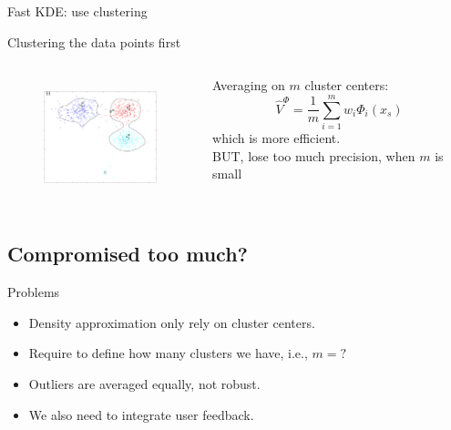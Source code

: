 \begin{frame}{Fast KDE: use clustering}
\begin{flushleft}
Clustering the data points first
\end{flushleft}
\begin{columns}
\hskip10pt
\begin{column}{.35\textwidth}
\begin{figure}
\includegraphics[width=3.5cm, height=3.5cm]{imgs/kclust}
\end{figure}
\end{column}
\begin{column}{.65\textwidth}
\small
\centering
Averaging on $m$ cluster centers:
\[
\hat{V}^\Phi=\frac{1}{m}\sum_{i=1}^m w_i\Phi_i(x_s)
\]
which is more efficient.\\ \vskip20pt \pause
\alert{BUT, lose too much precision, when $m$ is small}
\end{column}
\end{columns}
\end{frame}


\subsection{Compromised too much?}
\begin{frame}{Problems}
\begin{itemize}
\item Density approximation only rely on cluster centers.
\item Require to define how many clusters we have, i.e., $m=?$
\item Outliers are averaged equally, not robust.
\item We also need to integrate user feedback.
\end{itemize}
\end{frame}

